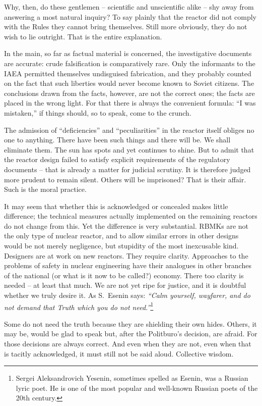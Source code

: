 \documentclass[openright]{bookest}
\begin{document}
Why, then, do these gentlemen -- scientific and unscientific alike -- shy away from answering a most natural inquiry? To say plainly that the reactor did not comply with the Rules they cannot bring themselves. Still more obviously, they do not wish to lie outright. That is the entire explanation.

In the main, so far as factual material is concerned, the investigative documents are accurate: crude falsification is comparatively rare. Only the informants to the IAEA permitted themselves undisguised fabrication, and they probably counted on the fact that such liberties would never become known to Soviet citizens. The conclusions drawn from the facts, however, are not the correct ones; the facts are placed in the wrong light. For that there is always the convenient formula: ``I was mistaken,'' if things should, so to speak, come to the crunch.


The admission of ``deficiencies'' and ``peculiarities'' in the reactor itself obliges no one to anything. There have been such things and there will be. We shall eliminate them. The sun has spots and yet continues to shine. But to admit that the reactor design failed to satisfy explicit requirements of the regulatory documents -- that is already a matter for judicial scrutiny. It is therefore judged more prudent to remain silent. Others will be imprisoned? That is their affair. Such is the moral practice.

It may seem that whether this is acknowledged or concealed makes little difference; the technical measures actually implemented on the remaining reactors do not change from this. Yet the difference is very substantial. RBMKs are not the only type of nuclear reactor, and to allow similar errors in other designs would be not merely negligence, but stupidity of the most inexcusable kind. Designers are at work on new reactors. They require clarity. Approaches to the problems of safety in nuclear engineering have their analogues in other branches of the national (or what is it now to be called?) economy. There too clarity is needed -- at least that much. We are not yet ripe for justice, and it is doubtful whether we truly desire it. As S.~Esenin says: \textit{``Calm yourself, wayfarer, and do not demand that Truth which you do not need.''}\footnote{Sergei Aleksandrovich Yesenin, sometimes spelled as Esenin, was a Russian lyric poet. He is one of the most popular and well-known Russian poets of the 20th century.}

Some do not need the truth because they are shielding their own hides. Others, it may be, would be glad to speak but, after the Politburo's decision, are afraid. For those decisions are always correct. And even when they are not, even when that is tacitly acknowledged, it must still not be said aloud. Collective wisdom.
\end{document}
